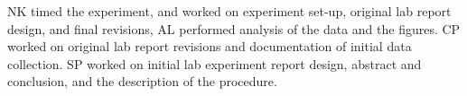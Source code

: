 ﻿\documentclass[reprint,amsmath,amssymb,aps]{revtex4-2}
\begin{document}
NK timed the experiment, and worked on experiment set-up, original lab report design, and final revisions, AL performed analysis of the data and the figures. CP worked on original lab report revisions and documentation of initial data collection. SP worked on initial lab experiment report design, abstract and conclusion, and the description of the procedure. 




%

\end{document}
